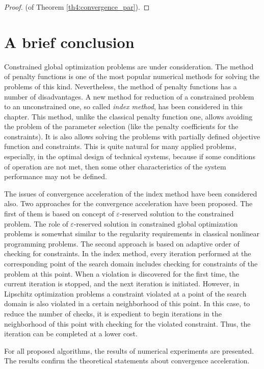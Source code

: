 \documentclass[graybox]{svmult}
\begin{document}
\begin{proof} (of Theorem \ref{th4:convergence_par}).

\end{proof}

\section*{A brief conclusion}
Constrained global optimization problems are under consideration. The method of penalty functions is one of the most popular numerical methods for solving the problems of this kind. Nevertheless, the method of penalty functions has a number of disadvantages. A new method for reduction of a constrained problem to an unconstrained one, so called \emph{index method}, has been considered in this chapter. This method, unlike the classical penalty function one, allows avoiding the problem of the parameter selection (like the penalty coefficients for the constraints). It is also allows solving the problems with partially defined objective function and constraints. This is quite natural for many applied problems, especially, in the optimal design of technical systems, because if some conditions of operation are not met, then some other characteristics of the system performance may not be defined.

The issues of convergence acceleration of the index method have been considered also. Two approaches for the convergence acceleration have been proposed. The first of them is based on concept of $\varepsilon$-reserved solution to the constrained problem. The role of $\varepsilon$-reserved solution in constrained global optimization problems is somewhat similar to the regularity requirements in classical nonlinear programming problems. The second approach is based on adaptive order of checking for constraints. In the index method, every iteration performed at the corresponding point of the search domain includes checking for constraints of the problem at this point. When a violation is discovered for the first time, the current iteration is stopped, and the next iteration is initiated. However, in Lipschitz optimization problems a constraint violated at a point of the search domain is also violated in a certain neighborhood of this point. In this case, to reduce the number of checks, it is expedient to begin iterations in the neighborhood of this point with checking for the violated constraint. Thus, the iteration can be completed at a lower cost.

For all proposed algorithms, the results of numerical experiments are presented. The results confirm the theoretical statements about convergence acceleration.
\end{document}

